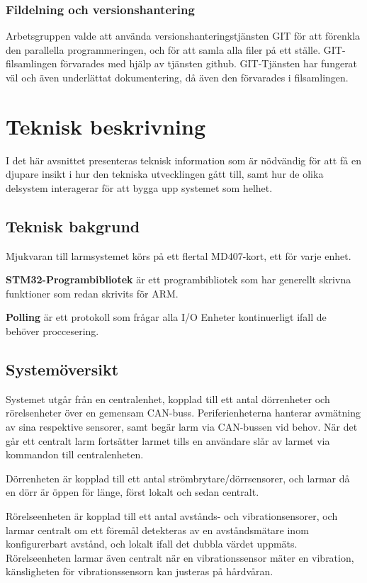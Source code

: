 \documentclass{article}
\begin{document}
\subsubsection{Fildelning och versionshantering}
Arbetsgruppen valde att använda versionshanteringstjänsten GIT för att förenkla den parallella programmeringen, och för att samla alla filer på ett ställe. GIT-filsamlingen förvarades med hjälp av tjänsten github. GIT-Tjänsten har fungerat väl och även underlättat dokumentering, då även den förvarades i filsamlingen.

\section{Teknisk beskrivning} %
I det här avsnittet presenteras teknisk information som är nödvändig för att få en djupare insikt i hur den tekniska utvecklingen gått till, samt hur de olika delsystem interagerar för att bygga upp systemet som helhet.
\subsection{Teknisk bakgrund}
Mjukvaran till larmsystemet körs på ett flertal MD407-kort, ett för varje enhet.

\textbf{STM32-Programbibliotek}\cite{stm} är ett programbibliotek som har generellt skrivna funktioner som 
redan skrivits för ARM.

\textbf{Polling} är ett protokoll som frågar alla I/O Enheter kontinuerligt ifall de behöver proccesering.\subsection{Systemöversikt}

Systemet utgår från en centralenhet, kopplad till ett antal dörrenheter och rörelsenheter över en gemensam CAN-buss. Periferienheterna hanterar avmätning av sina respektive sensorer, samt begär larm via CAN-bussen vid behov. När det går ett centralt larm fortsätter larmet tills en användare slår av larmet via kommandon till centralenheten.

Dörrenheten är kopplad till ett antal strömbrytare/dörrsensorer, och larmar då en dörr är öppen för länge, först lokalt och sedan centralt.

Rörelseenheten är kopplad till ett antal avstånds- och vibrationsensorer, och larmar centralt om ett föremål detekteras av en avståndsmätare inom konfigurerbart avstånd, och lokalt ifall det dubbla värdet uppmäts.
Rörelseenheten larmar även centralt när en vibrationssensor mäter en vibration, känsligheten för vibrationssensorn kan justeras på hårdvåran.
\end{document}
